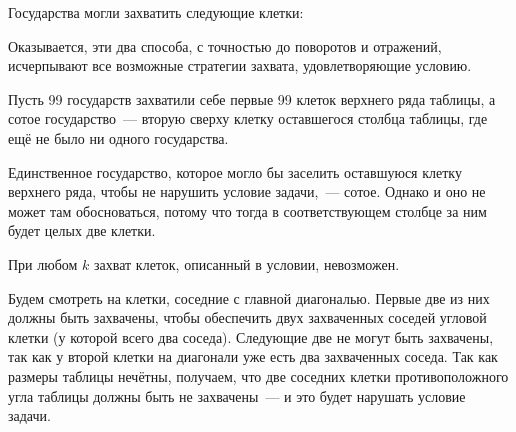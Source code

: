 \begin{itemize}

\itA Государства могли захватить следующие клетки:

\smallskip
\begin{center} \end{center}

Оказывается, эти два способа, с точностью до поворотов и отражений, исчерпывают все возможные стратегии захвата, удовлетворяющие условию.

\itB Пусть 99 государств захватили себе первые 99 клеток верхнего ряда таблицы, а сотое государство~— вторую сверху клетку оставшегося столбца таблицы, где ещё не было ни одного государства.

Единственное государство, которое могло бы заселить оставшуюся клетку верхнего ряда, чтобы не нарушить условие задачи,~— сотое. Однако и оно не может там обосноваться, потому что тогда в соответствующем столбце за ним будет целых две клетки.

\itC При любом $k$ захват клеток, описанный в условии, невозможен.

\begin{center}
\end{center}

Будем смотреть на клетки, соседние с главной диагональю. Первые две из них должны быть захвачены, чтобы обеспечить двух захваченных соседей угловой клетки (у которой всего два соседа). Следующие две не могут быть захвачены, так как у второй клетки на диагонали уже есть два захваченных соседа. Так как размеры таблицы нечётны, получаем, что две соседних клетки противоположного угла таблицы должны быть не захвачены~— и это будет нарушать условие задачи.
\end{itemize}